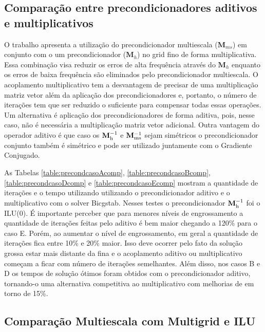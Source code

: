 \FloatBarrier

\subsection{Comparação entre precondicionadores aditivos e multiplicativos}

O trabalho \cite{casteletto} apresenta a utilização do precondicionador multiescala ($\mathbf{M}_{ms}$) em conjunto com o um precondicionador ($\mathbf{M}_h$) no grid fino de forma multiplicativa. 
Essa combinação visa reduzir os erros de alta frequência através do $\mathbf{M}_h$ enquanto os erros de baixa frequência são eliminados pelo precondicionador multiescala. 
O acoplamento multiplicativo tem a desvantagem de precisar de uma multiplicação matriz vetor além da aplicação dos precondicionadores
e, portanto, o número de iterações tem que ser reduzido o suficiente para compensar todas essas operações. Um alternativa é aplicação
dos precondicionadores de forma aditiva, pois, nesse caso, não é necessária a multiplicação matriz vetor adicional. Outra vantagem do operador aditivo é que caso os $\mathbf{M}^{-1}_{\text{h}}$ e $\mathbf{M}^{-1}_{\text{ms}}$ sejam simétricos o precondicionador conjunto também é simétrico e pode ser utilizado juntamente com o Gradiente Conjugado.


As Tabelas \ref{table:precondcasoAcomp}, \ref{table:precondcasoBcomp}, \ref{table:precondcasoDcomp} e \ref{table:precondcasoEcomp} mostram a quantidade de iterações e o tempo utilizando utilizando o precondicionador aditivo e o multiplicativo com o solver Bicgstab. Nesses testes o precondicionador $\mathbf{M}^{-1}_{\text{h}}$ foi o ILU(0). É importante perceber que para menores níveis de engrossamento a quantidade de iterações feitas pelo aditivo é bem maior chegando a 120\% para o caso E. Porém, ao aumentar o nível de engrossamento, em geral a quantidade de iterações fica entre 10\% e 20\% maior. Isso deve ocorrer pelo fato da solução grossa estar mais distante da fina e o acoplamento aditivo ou multiplicativo começam a ficar com número de iterações semelhantes. Além disso, nos casos B e D os tempos de solução ótimos foram obtidos com o precondicionador aditivo, tornando-o uma alternativa competitiva ao multiplicativo com melhorias de em torno de 15\%.







\subsection{Comparação Multiescala com Multigrid e ILU}


